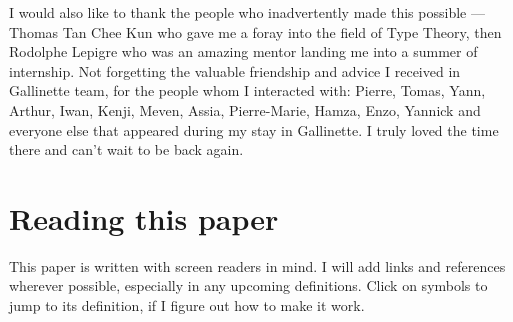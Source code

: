 I would also like to thank the people who inadvertently made this possible ---
Thomas Tan Chee Kun who gave me a foray into the field of Type Theory, then
Rodolphe Lepigre who was an amazing mentor landing me into a summer of internship.
Not forgetting the valuable friendship and advice I received in Gallinette team,
for the people whom I interacted with: Pierre, Tomas, Yann, Arthur, Iwan, Kenji,
Meven, Assia, Pierre-Marie, Hamza, Enzo, Yannick and everyone else that appeared
during my stay in Gallinette. I truly loved the time there and can't wait to be
back again.

\chapter*{Reading this paper}

This paper is written with screen readers in mind. I will add links and
references wherever possible, especially in any upcoming definitions. Click on 
symbols to jump to its definition, if I figure out how to make it work.

\endgroup


\begingroup %

\hypersetup{linkcolor=.} %
\setlength{\textheight}{230\vscale} %

\etocstandarddisplaystyle %
\etocstandardlines %
\setcounter{tocdepth}{\subsectiontocdepth}

\tableofcontents %


\let\cleardoublepage\bigskip
\let\clearpage\bigskip


\endgroup
